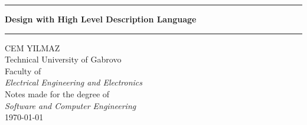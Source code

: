 \documentclass[a4paper, 12pt]{article}
\newcommand{\coloredrule}[2][tugblue]{%
  \textcolor{#1}{\rule{\linewidth}{#2}}%
}
\theoremstyle{plain}
\theoremstyle{definition}
\theoremstyle{remark}
\begin{document}
	\begin{titlepage}
	        \vspace*{0.8cm}
	        \begin{center}
	                \coloredrule{2pt}\par
	                \vskip 0.6cm
	                \textbf{\Huge Design with High Level Description Language}\par
	                \vskip 0.3cm
	                \coloredrule{2pt}\par
	
	                \vskip 3cm
	
	                
	
	                \vspace{3cm} %
	                \Large CEM YILMAZ \\
	                \Large Technical University of Gabrovo \\
	                \Large Faculty of \\
	                \Large\textit{Electrical Engineering and Electronics}\\
	
	                \vspace{2cm}
	                \Large Notes made for the degree of\\
	                \Large \textit{Software and Computer Engineering}\\
	                \Large \today \\
	                \vspace{0.5cm}
	
	                \vfill  %
	        \end{center}
	\end{titlepage}
	
	\tableofcontents
	\newpage
\end{document}
